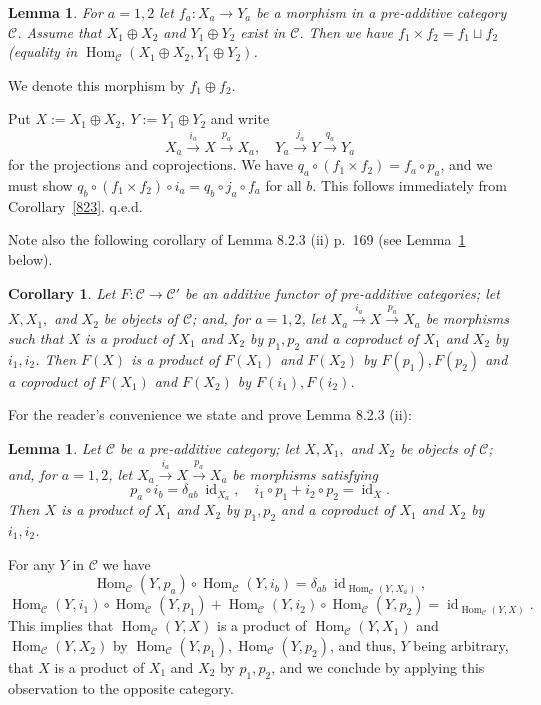 \documentclass[12pt]{article}
\newtheorem{lem}[thm]{Lemma}
\newtheorem{cor}[thm]{Corollary}
\theoremstyle{remark}%
\newcommand{\n}{\noindent}
\newcommand{\C}{\mathcal C}
\newcommand{\xr}{\xrightarrow}
\DeclareMathOperator{\id}{id}
\DeclareMathOperator{\h}{Hom}
\begin{document}
\begin{lem}
For $a=1,2$ let $f_a:X_a\to Y_a$ be a morphism in a pre-additive category $\C$. Assume that $X_1\oplus X_2$ and $Y_1\oplus Y_2$ exist in $\C$. Then we have $f_1\times f_2=f_1\sqcup f_2$ (equality in $\h_\C(X_1\oplus X_2,Y_1\oplus Y_2)$. 
\end{lem} 

We denote this morphism by $f_1\oplus f_2$.\medskip 

\n{\em Proof.} Put $X:=X_1\oplus X_2,\ Y:=Y_1\oplus Y_2$ and write 
$$
X_a\xr{i_a}X\xr{p_a}X_a,\quad Y_a\xr{j_a}Y\xr{q_a}Y_a
$$ 
for the projections and coprojections. We have $q_a\circ(f_1\times f_2)=f_a\circ p_a$, and we must show $q_b\circ (f_1\times f_2)\circ i_a=q_b\circ j_a\circ f_a$ for all $b$. This follows immediately from Corollary~\ref{823}. q.e.d. 

Note also the following corollary of Lemma 8.2.3 (ii) p.~169 (see Lemma~\ref{823ii} below). 
%
\begin{cor}\label{823b}
Let $F:\C\to\C'$ be an additive functor of pre-additive categories; let $X,X_1,$ and $X_2$ be objects of $\C$; and, for $a=1,2$, let $X_a\xr{i_a}X\xr{p_a}X_a$ be morphisms such that $X$ is a product of $X_1$ and $X_2$ by $p_1,p_2$ and a coproduct of $X_1$ and $X_2$ by $i_1,i_2$. Then $F(X)$ is a product of $F(X_1)$ and $F(X_2)$ by $F(p_1),F(p_2)$ and a coproduct of $F(X_1)$ and $F(X_2)$ by $F(i_1),F(i_2)$. 
\end{cor}

For the reader's convenience we state and prove Lemma 8.2.3 (ii):
%
\begin{lem}\label{823ii}
Let $\C$ be a pre-additive category; let $X,X_1,$ and $X_2$ be objects of $\C$; and, for $a=1,2$, let $X_a\xr{i_a}X\xr{p_a}X_a$ be morphisms satisfying 
$$
p_a\circ i_b=\delta_{ab}\ \id_{X_a},\quad i_1\circ p_1+i_2\circ p_2=\id_X.
$$
Then $X$ is a product of $X_1$ and $X_2$ by $p_1,p_2$ and a coproduct of $X_1$ and $X_2$ by $i_1,i_2$. 
\end{lem}
%
\n{\em Proof.} For any $Y$ in $\C$ we have 
$$
\h_\C(Y,p_a)\circ\h_\C(Y,i_b)=\delta_{ab}\ \id_{\h_\C(Y,X_a)},
$$ 
$$
\h_\C(Y,i_1)\circ\h_\C(Y,p_1)+\h_\C(Y,i_2)\circ\h_\C(Y,p_2)=\id_{\h_\C(Y,X)}.
$$ 
This implies that $\h_\C(Y,X)$ is a product of $\h_\C(Y,X_1)$ and $\h_\C(Y,X_2)$ by $\h_\C(Y,p_1),\h_\C(Y,p_2)$, and thus, $Y$ being arbitrary, that $X$ is a product of $X_1$ and $X_2$ by $p_1,p_2$, and we conclude by applying this observation to the opposite category. 

\end{document}
